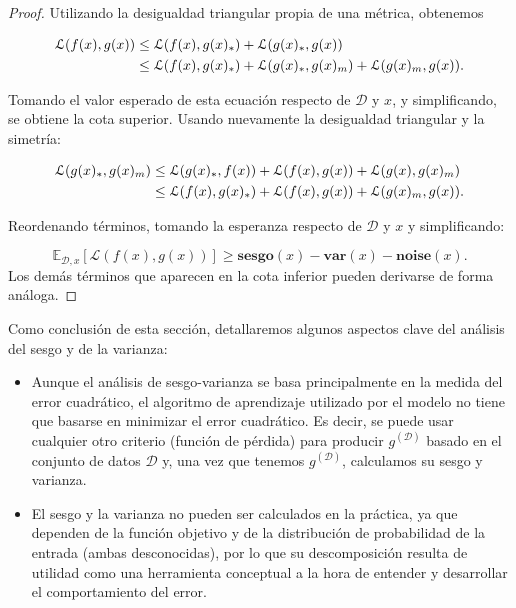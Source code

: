 \begin{proof}
    Utilizando la desigualdad triangular propia de una métrica, obtenemos

    \begin{align}
        \mathcal{L}(f(x), g(x)) 
        &\leq \mathcal{L}(f(x), g(x)_*) + \mathcal{L}(g(x)_*, g(x)) \notag \\
        &\leq \mathcal{L}(f(x), g(x)_*) + \mathcal{L}(g(x)_*, g(x)_m) + \mathcal{L}(g(x)_m, g(x)).
    \end{align}
    

    Tomando el valor esperado de esta ecuación respecto de $\mathcal{D}$ y $x$, y simplificando, se obtiene la cota superior. Usando nuevamente la desigualdad triangular y la simetría:

    \begin{align}
        \mathcal{L}(g(x)_*, g(x)_m) 
        &\leq \mathcal{L}(g(x)_*, f(x)) + \mathcal{L}(f(x), g(x)) + \mathcal{L}(g(x), g(x)_m) \notag \\
        &\leq \mathcal{L}(f(x), g(x)_*) + \mathcal{L}(f(x), g(x)) + \mathcal{L}(g(x)_m, g(x)).
    \end{align}

    Reordenando términos, tomando la esperanza respecto de $\mathcal{D}$ y $x$ y simplificando: 

    \[
        \mathbb{E}_{\mathcal{D}, x}[\mathcal{L}(f(x), g(x))] \geq \textbf{sesgo}(x) - \textbf{var}(x) - \textbf{noise}(x).
    \]
    Los demás términos que aparecen en la cota inferior pueden derivarse de forma análoga.
\end{proof}


Como conclusión de esta sección, detallaremos algunos aspectos clave del análisis del sesgo y de la varianza:

\begin{itemize}
    \item Aunque el análisis de sesgo-varianza se basa principalmente en la medida del error cuadrático, el algoritmo de aprendizaje utilizado por el modelo no tiene que basarse en minimizar el error cuadrático. Es decir, se puede usar cualquier otro criterio (función de pérdida) para producir $g^{\mathcal{(D)}}$ basado en el conjunto de datos $\mathcal{D}$ y, una vez que tenemos $g^{\mathcal{(D)}}$, calculamos su sesgo y varianza.
    \item El sesgo y la varianza no pueden ser calculados en la práctica, ya que dependen de la función objetivo y de la distribución de probabilidad de la entrada (ambas desconocidas), por lo que su descomposición resulta de utilidad como una herramienta conceptual a la hora de entender y desarrollar el comportamiento del error.
    
\end{itemize}

